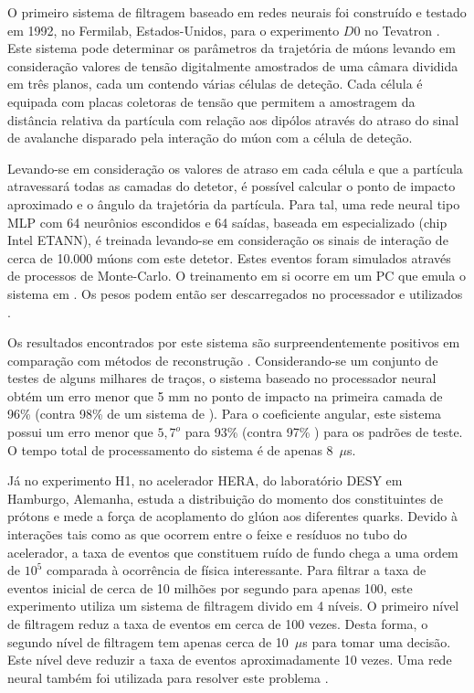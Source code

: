 O primeiro sistema de filtragem baseado em redes neurais foi construído e
testado em 1992, no Fermilab, Estados-Unidos, para o experimento $D0$ no
Tevatron \cite{lindsey-nim-1992}. Este sistema pode determinar os parâmetros
da trajetória de múons levando em consideração valores de tensão digitalmente
amostrados de uma câmara dividida em três planos, cada um contendo várias
células de deteção. Cada célula é equipada com placas coletoras de tensão que
permitem a amostragem da distância relativa da partícula com relação aos
dipólos através do atraso do sinal de avalanche disparado pela interação do
múon com a célula de deteção.

Levando-se em consideração os valores de atraso em cada célula e que a
partícula atravessará todas as camadas do detetor, é possível calcular o ponto
de impacto aproximado e o ângulo da trajetória da partícula. Para tal, uma
rede neural tipo MLP com 64 neurônios escondidos e 64 saídas, baseada em
 especializado (chip Intel ETANN), é treinada levando-se em
consideração os sinais de interação de cerca de 10.000 múons com este
detetor. Estes eventos foram simulados através de processos de Monte-Carlo. O
treinamento em si ocorre em um PC que emula o sistema em . Os
pesos podem então ser descarregados no processador e utilizados
.

Os resultados encontrados por este sistema são surpreendentemente positivos em
comparação com métodos de reconstrução . Considerando-se um
conjunto de testes de alguns milhares de traços, o sistema baseado no
processador neural obtém um erro menor que 5 mm no ponto de impacto na
primeira camada de 96\% (contra 98\% de um sistema de 
). Para o coeficiente angular, este sistema possui um erro menor
que $5,7^{o}$ para 93\% (contra 97\% ) para os padrões de
teste. O tempo total de processamento do sistema é de apenas 8~$\mu$s.

Já no experimento H1, no acelerador HERA, do laboratório DESY em Hamburgo,
Alemanha, estuda a distribuição do momento dos constituintes de prótons e mede
a força de acoplamento do glúon aos diferentes quarks. Devido à interações
tais como as que ocorrem entre o feixe e resíduos no tubo do acelerador, a
taxa de eventos que constituem ruído de fundo chega a uma ordem de $10^5$
comparada à ocorrência de física interessante. Para filtrar a taxa de eventos
inicial de cerca de 10 milhões por segundo para apenas 100, este experimento
utiliza um sistema de filtragem divido em 4 níveis. O primeiro nível de
filtragem reduz a taxa de eventos em cerca de 100 vezes. Desta forma, o
segundo nível de filtragem tem apenas cerca de 10~$\mu$s para tomar uma
decisão. Este nível deve reduzir a taxa de eventos aproximadamente 10
vezes. Uma rede neural também foi utilizada para resolver este problema
\cite{kohne-nim-1997}. 

